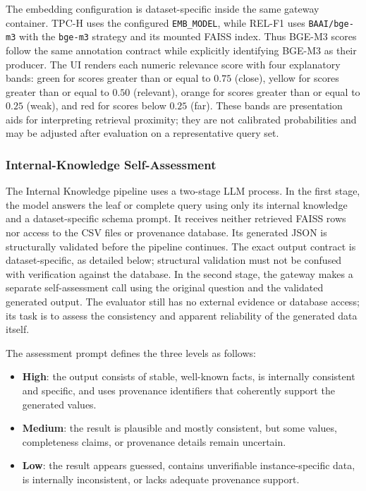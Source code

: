 \documentclass[11pt,a4paper]{article}
\newcommand{\code}[1]{\texttt{#1}}
\begin{document}
The embedding configuration is dataset-specific inside the same gateway
container. TPC-H uses the configured \code{EMB\_MODEL}, while REL-F1 uses
\code{BAAI/bge-m3} with the \code{bge-m3} strategy and its mounted FAISS index.
Thus BGE-M3 scores follow the same annotation contract while explicitly
identifying BGE-M3 as their producer. The UI renders each numeric relevance
score with four explanatory bands: green for scores greater than or equal to
$0.75$ (close), yellow for scores greater than or equal to $0.50$ (relevant),
orange for scores greater than or equal to $0.25$ (weak), and red for scores
below $0.25$ (far). These bands are presentation aids for interpreting
retrieval proximity; they are not calibrated probabilities and may be adjusted
after evaluation on a representative query set.

\subsubsection{Internal-Knowledge Self-Assessment}

The Internal Knowledge pipeline uses a two-stage LLM process. In the first
stage, the model answers the leaf or complete query using only its internal
knowledge and a dataset-specific schema prompt. It receives neither retrieved
FAISS rows nor access to the CSV files or provenance database. Its generated
JSON is structurally validated before the pipeline continues. The exact output
contract is dataset-specific, as detailed below; structural validation must not
be confused with verification against the database. In the second stage, the
gateway makes a separate
self-assessment call using the original question and the validated generated
output. The evaluator still has no external evidence or database access; its
task is to assess the consistency and apparent reliability of the generated
data itself.

The assessment prompt defines the three levels as follows:

\begin{itemize}
  \item \textbf{High}: the output consists of stable, well-known facts, is
        internally consistent and specific, and uses provenance identifiers
        that coherently support the generated values.
  \item \textbf{Medium}: the result is plausible and mostly consistent, but
        some values, completeness claims, or provenance details remain
        uncertain.
  \item \textbf{Low}: the result appears guessed, contains unverifiable
        instance-specific data, is internally inconsistent, or lacks adequate
        provenance support.
\end{itemize}
\end{document}
